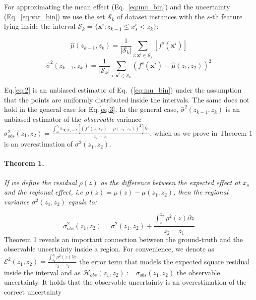 \documentclass[twoside]{article}
\newcommand{\dfdx}{f^s}
\newcommand{\xc}{\mathbf{x}_c}
\begin{document}
For approximating the mean effect (Eq.~\eqref{eq:mu_bin}) and the
uncertainty (Eq.~\eqref{eq:var_bin}) we use the set \(\mathcal{S}_k\)
of dataset instances with the \(s\)-th feature lying inside the
interval
\( \mathcal{S}_k= \{ \mathbf{x}^i : z_{k-1} \leq x^i_s < z_k \} \):

\begin{equation}
  \label{eq:2}
  \hat{\mu}(z_{k-1}, z_k) = \frac{1}{|\mathcal{S}_k|}
  \sum_{i:\mathbf{x}^i \in \mathcal{S}_k} \left [ \dfdx(\mathbf{x}^i)
  \right ]
\end{equation}
%
\begin{equation}
  \label{eq:3}
  \hat{\sigma}^2(z_{k-1}, z_k) = \frac{1}{|\mathcal{S}_k|}
\sum_{i:\mathbf{x}^i \in \mathcal{S}_k} \left ( \dfdx(\mathbf{x}^i) -
  \hat{\mu}(z_1, z_2) \right )^2
\end{equation}

Eq.\eqref{eq:2} is an unbiased estimator of Eq.~(\ref{eq:mu_bin})
under the assumption that the points are uniformly distributed inside
the intervals. The same does not hold in the general case for
Eq.\eqref{eq:3}. In the general case, \(\hat{\sigma}^2(z_{k-1}, z_k)\)
is an unbiased estimator of the \textit{observable} variance
\(\sigma^2_{obs}(z_1, z_2) = \frac{\int_{z_1}^{z_2}
    \mathbb{E}_{\xc|x_s=z} \left [ (f^s(z, \xc) - \mu(z_1, z_2) )^2
    \right] \partial z}{z_2 - z_1}\), which as we prove in Theorem 1
is an overestimation of \(\sigma^2(z_1, z_2)\).

\paragraph{Theorem 1.}
\label{sec:theorem-1}

\textit{If we define the residual \(\rho(z)\) as the difference
  between the expected effect at \(x_s\) and the regional effect, i.e
  \(\rho(z) = \mu(z) - \mu(z_1, z_2)\), then the regional variance
  \(\sigma^2(z_1, z_2)\) equals to:}

\begin{equation}
    \label{eq:bin-uncertainty-proof}
 \sigma_{obs}^2(z_1, z_2) = \sigma^2(z_1, z_2) + \frac{\int_{z_1}^{z_2}\rho^2(z) \partial z}{z_2 - z_1}
\end{equation}
\noindent
Theorem 1 reveals an important connection between the ground-truth and
the observable uncertainty inside a region. For convenience, we denote
as
\(\mathcal{E}^2(z_1, z_2) = \frac{\int_{z_1}^{z_2}\rho^2(z) \partial
  z}{z_2 - z_1}\) the error term that models the expected square
residual inside the interval and as
\(\mathcal{H}_{obs}(z_1, z_2) := \sigma_{obs}(z_1, z_2)\) the
observable uncertainty. It holds that the observable uncertainty is an
overestimation of the correct uncertainty
\end{document}
